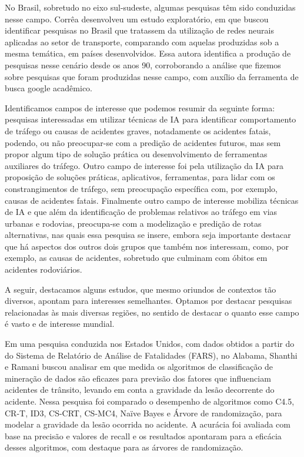 No Brasil, sobretudo no eixo sul-sudeste, algumas pesquisas têm sido conduzidas nesse campo. Corrêa \cite{correa2008aplicaccao} desenvolveu um estudo exploratório, em que buscou identificar pesquisas no Brasil que tratassem da utilização de redes neurais aplicadas ao setor de transporte, comparando com aquelas produzidas sob a mesma temática, em países desenvolvidos. Essa autora identifica a produção de pesquisas nesse cenário desde os anos 90, corroborando a análise que fizemos sobre pesquisas que foram produzidas nesse campo, com auxílio da ferramenta de busca google acadêmico.

Identificamos campos de interesse que podemos resumir da seguinte forma: pesquisas interessadas em utilizar técnicas de IA para identificar comportamento de tráfego ou causas de acidentes graves, notadamente os acidentes fatais, podendo, ou não preocupar-se com a predição de acidentes futuros, mas sem propor algum tipo de solução prática ou desenvolvimento de ferramentas auxiliares do tráfego. Outro campo de interesse foi pela utilização da IA para proposição de soluções práticas, aplicativos, ferramentas, para lidar com os constrangimentos de tráfego, sem preocupação específica com, por exemplo, causas de acidentes fatais. Finalmente outro campo de interesse mobiliza técnicas de IA e que além da identificação de problemas relativos ao tráfego em vias urbanas e rodovias, preocupa-se com a modelização e predição de rotas alternativas, nas quais essa pesquisa se insere, embora seja importante destacar que há aspectos dos outros dois grupos que também nos interessam, como, por exemplo, as causas de acidentes, sobretudo que culminam com óbitos em acidentes rodoviários. 

A seguir, destacamos alguns estudos, que mesmo oriundos de contextos tão diversos, apontam para interesses semelhantes. Optamos por destacar pesquisas relacionadas às mais diversas regiões, no sentido de destacar o quanto esse campo é vasto e de interesse mundial.

Em uma pesquisa conduzida nos Estados Unidos, com dados obtidos a partir do do Sistema de Relatório de Análise de Fatalidades (FARS), no Alabama, Shanthi e Ramani \cite{shanthi2012feature} buscou analisar em que medida os algoritmos de classificação de mineração de dados são eficazes para previsão dos fatores que influenciam acidentes de trânsito, levando em conta a gravidade da lesão decorrente do acidente. Nessa pesquisa foi comparado o desempenho de algoritmos como C4.5, CR-T, ID3, CS-CRT, CS-MC4, Naïve Bayes e Árvore de randomização, para modelar a gravidade da lesão ocorrida no acidente. A acurácia foi avaliada com base na precisão e valores de recall e os resultados apontaram para a eficácia desses algoritmos, com destaque para as árvores de randomização.

